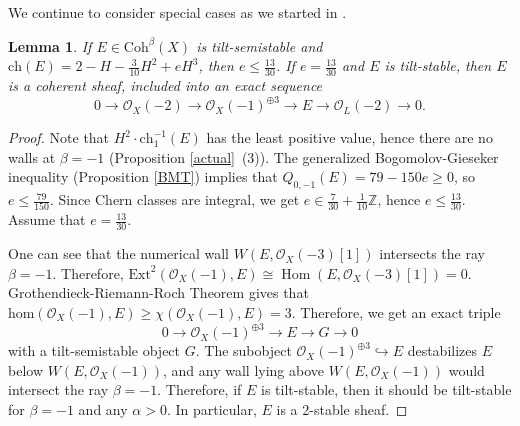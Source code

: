 \documentclass{amsart}
\DeclareMathOperator{\Hom}{Hom}
\newtheorem{lemma}[theorem]{Lemma}
\begin{document}
	We continue to consider special cases as we started in \cite{Vass}.
	
	\begin{lemma}\label{2 -1 -3/10} If $E\in\mathrm{Coh}^\beta(X)$ is tilt-semistable and $\mathrm{ch}(E)=2-H-\frac{3}{10}H^2+eH^3$, then $e\le\frac{13}{30}$. If $e=\frac{13}{30}$ and $E$ is tilt-stable, then $E$ is a coherent sheaf, included into an exact sequence
		\begin{equation}\label{sequence}0\to\mathcal O_X(-2)\to\mathcal O_X(-1)^{\oplus 3}\to E\to\mathcal O_L(-2)\to 0.\end{equation}
	\end{lemma}
	
	\begin{proof}Note that $H^2\cdot\mathrm{ch}_1^{-1}(E)$ has the least positive value, hence there are no walls at $\beta=-1$ (Proposition \ref{actual}~(3)). The generalized Bogomolov-Gieseker inequality (Proposition \ref{BMT}) implies that $Q_{0,-1}(E)=79-150e\ge 0$, so $e\le\frac{79}{150}$. Since Chern classes are integral, we get $e\in\frac{7}{30}+\frac{1}{10}\mathbb Z$, hence $e\le\frac{13}{30}$. Assume that $e=\frac{13}{30}$. 
		
	One can see that the numerical wall $W(E,\mathcal O_X(-3)[1])$ intersects the ray $\beta=-1$. Therefore, $\mathrm{Ext}^2(\mathcal O_X(-1),E)\cong\Hom(E,\mathcal O_X(-3)[1])=0$. Grothendieck-Riemann-Roch Theorem gives that $\mathrm{hom}(\mathcal O_X(-1),E)\ge\chi(\mathcal O_X(-1),E)=3$. Therefore, we get an exact triple
	\begin{equation}\label{G}0\to\mathcal O_X(-1)^{\oplus 3}\to E\to G\to 0\end{equation}
	with a tilt-semistable object $G$. The subobject $\mathcal O_X(-1)^{\oplus 3}\hookrightarrow E$ destabilizes $E$ below $W(E,\mathcal O_X(-1))$, and any wall lying above $W(E,\mathcal O_X(-1))$ would intersect the ray $\beta=-1$. Therefore, if $E$ is tilt-stable, then it should be tilt-stable for $\beta=-1$ and any $\alpha>0$. In particular, $E$ is a 2-stable sheaf.
		

\end{proof}
\end{document}
